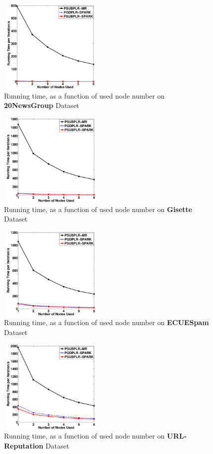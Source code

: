 \documentclass[10pt, conference, compsocconf]{IEEEtran}
\begin{document}
\begin{figure}[tb] \label{fig:10}
\center \includegraphics[height=4.5cm,width=5cm]{img/20NewsGroup_time.eps}
\caption{Running time, as a function of used node number on \textbf{20NewsGroup} Dataset}
\end{figure}

\begin{figure}[tb] \label{fig:11}
\center \includegraphics[height=4.5cm,width=5cm]{img/Gisette_time.eps}
\caption{Running time, as a function of used node number on \textbf{Gisette} Dataset}
\end{figure}

\begin{figure}[tb] \label{fig:12}
\center \includegraphics[height=4.5cm,width=5cm]{img/ECUESpam_time.eps}
\caption{Running time, as a function of used node number on \textbf{ECUESpam} Dataset}
\end{figure}

\begin{figure}[tb] \label{fig:13}
\center \includegraphics[height=4.5cm,width=5cm]{img/URL-Reputation_time.eps}
\caption{Running time, as a function of used node number on \textbf{URL-Reputation} Dataset}
\end{figure}
\end{document}
